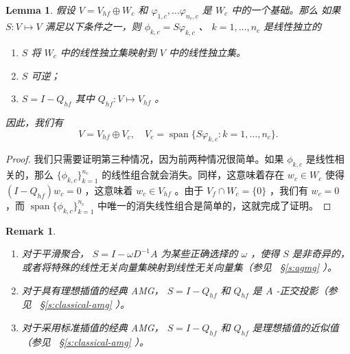 \documentclass[12pt]{acta_2011xz}
\newtheorem{lemma}[theorem]{Lemma}
\newtheorem{remark}[theorem]{Remark}
\begin{document}
   \begin{lemma}   \label{lem:basis-in-vc}    假设    $V=V_{hf}\oplus
W_c$    和    $\varphi_{1,c},\ldots \varphi_{n_c,c}$    是    $W_c$    中的一个基础。那么
如果    $S: V\mapsto V$    满足以下条件之一，则    $\phi_{k,c} = S\varphi_{k,c}$    、    $k=1,\ldots,n_c$    是线性独立的
   \begin{enumerate}[1.]

   \item            $S$          将          $W_c$          中的线性独立集映射到          $V$          中的线性独立集。   \item            $S$          可逆；   \item            $S=I-Q_{hf}$          其中          $Q_{hf}: V\mapsto V_{hf}$          。  \end{enumerate}    因此，我们有
   \begin{equation*}
    V=V_{hf}\oplus V_c, \quad V_c=\operatorname{span} \{ S\varphi_{k,c}: k=1, \dots, n_c \} .
\end{equation*}     \end{lemma}    
   \begin{proof}我们只需要证明第三种情况，因为前两种情况很简单。如果    $\phi_{k,c}$    是线性相关的，那么    $ \{ \phi_{k,c} \} _{k=1}^{n_c}$    的线性组合就会消失。同样，这意味着存在    $w_c\in W_c$    使得    $(I-Q_{hf}) w_c=0$    ，这意味着    $w_c\in V_{hf}$    。由于
   $V_{f}\cap W_c= \{ 0 \} $    ，我们有    $w_c=0$    ，而    $\operatorname{span} \{ \phi_{k,c} \} _{k=1}^{n_c}$    中唯一的消失线性组合是简单的，这就完成了证明。  \end{proof}    
   \begin{remark}~

   \begin{enumerate}[1.]

   \item   对于平滑聚合，         $S=I-\omega D^{-1}A$          为某些正确选择的          $\omega$         ，使得          $S$          是非奇异的，或者将特殊的线性无关向量集映射到线性无关向量集（参见~    \S       \ref{s:agmg}    ）。   \item   对于具有理想插值的经典 AMG，         $S=I-Q_{hf}$          和
         $Q_{hf}$          是          $A$          -正交投影（参见~    \S       \ref{s:classical-amg}    ）。   \item   对于采用标准插值的经典 AMG，         $S=I-Q_{hf}$          和
         $Q_{hf}$          是理想插值的近似值（参见~    \S       \ref{s:classical-amg}    ）。  \end{enumerate}     \end{remark}     
\end{document}
